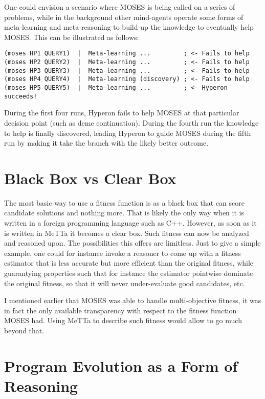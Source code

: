 \documentclass[]{report}
\begin{document}
One could envision a scenario where MOSES is being called on a series
of problems, while in the background other mind-agents operate some
forms of meta-learning and meta-reasoning to build-up the knowledge to
eventually help MOSES.  This can be illustrated as follows:

{\small
\begin{verbatim}
(moses HP1 QUERY1)  |  Meta-learning ...         ; <- Fails to help
(moses HP2 QUERY2)  |  Meta-learning ...         ; <- Fails to help
(moses HP3 QUERY3)  |  Meta-learning ...         ; <- Fails to help
(moses HP4 QUERY4)  |  Meta-learning (discovery) ; <- Fails to help
(moses HP5 QUERY5)  |  Meta-learning ...         ; <- Hyperon succeeds!
\end{verbatim}
} During the first four runs, Hyperon fails to help MOSES at that
particular decision point (such as deme continuation).  During the
fourth run the knowledge to help is finally discovered, leading
Hyperon to guide MOSES during the fifth run by making it take the
branch with the likely better outcome.

\section{Black Box vs Clear Box}
\label{sec:blackbox-clearbox}

The most basic way to use a fitness function is as a black box that
can score candidate solutions and nothing more.  That is likely the
only way when it is written in a foreign programming language such as
C++.  However, as soon as it is written in MeTTa it becomes a clear
box.  Such fitness can now be analyzed and reasoned upon.  The
possibilities this offers are limitless.  Just to give a simple
example, one could for instance invoke a reasoner to come up with a
fitness estimator that is less accurate but more efficient than the
original fitness, while guarantying properties such that for instance
the estimator pointwise dominate the original fitness, so that it will
never under-evaluate good candidates, etc.

I mentioned earlier that MOSES was able to handle multi-objective
fitness, it was in fact the only available transparency with respect
to the fitness function MOSES had.  Using MeTTa to describe such
fitness would allow to go much beyond that.

\section{Program Evolution as a Form of Reasoning}
\end{document}
